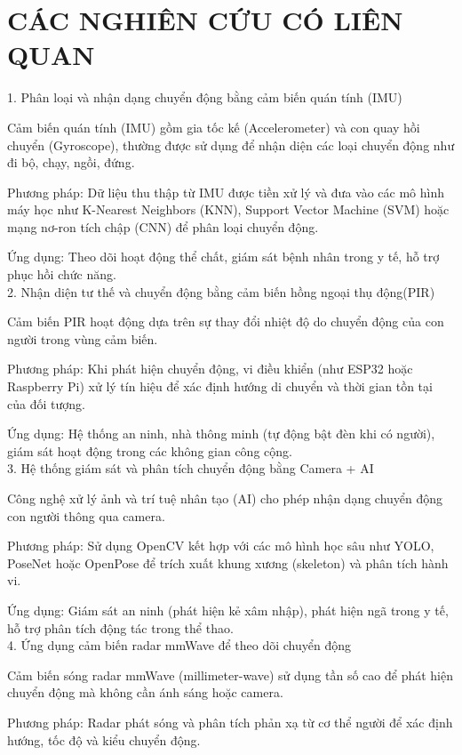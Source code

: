 \documentclass[journal]{IEEEtran}
\begin{document}
\section{CÁC NGHIÊN CỨU CÓ LIÊN QUAN}

1. Phân loại và nhận dạng chuyển động bằng cảm biến quán tính (IMU)

Cảm biến quán tính (IMU) gồm gia tốc kế (Accelerometer) và con quay hồi chuyển (Gyroscope), thường được sử dụng để nhận diện các loại chuyển động như đi bộ, chạy, ngồi, đứng.

Phương pháp: Dữ liệu thu thập từ IMU được tiền xử lý và đưa vào các mô hình máy học như K-Nearest Neighbors (KNN), Support Vector Machine (SVM) hoặc mạng nơ-ron tích chập (CNN) để phân loại chuyển động.

Ứng dụng: Theo dõi hoạt động thể chất, giám sát bệnh nhân trong y tế, hỗ trợ phục hồi chức năng.\\

2.  Nhận diện tư thế và chuyển động bằng cảm biến hồng ngoại thụ động(PIR)

Cảm biến PIR hoạt động dựa trên sự thay đổi nhiệt độ do chuyển động của con người trong vùng cảm biến.

Phương pháp: Khi phát hiện chuyển động, vi điều khiển (như ESP32 hoặc Raspberry Pi) xử lý tín hiệu để xác định hướng di chuyển và thời gian tồn tại của đối tượng.

Ứng dụng: Hệ thống an ninh, nhà thông minh (tự động bật đèn khi có người), giám sát hoạt động trong các không gian công cộng.\\

3. Hệ thống giám sát và phân tích chuyển động bằng Camera + AI

Công nghệ xử lý ảnh và trí tuệ nhân tạo (AI) cho phép nhận dạng chuyển động con người thông qua camera.

Phương pháp: Sử dụng OpenCV kết hợp với các mô hình học sâu như YOLO, PoseNet hoặc OpenPose để trích xuất khung xương (skeleton) và phân tích hành vi.

Ứng dụng: Giám sát an ninh (phát hiện kẻ xâm nhập), phát hiện ngã trong y tế, hỗ trợ phân tích động tác trong thể thao.\\

4. Ứng dụng cảm biến radar mmWave để theo dõi chuyển động

Cảm biến sóng radar mmWave (millimeter-wave) sử dụng tần số cao để phát hiện chuyển động mà không cần ánh sáng hoặc camera.

Phương pháp: Radar phát sóng và phân tích phản xạ từ cơ thể người để xác định hướng, tốc độ và kiểu chuyển động.
\end{document}
